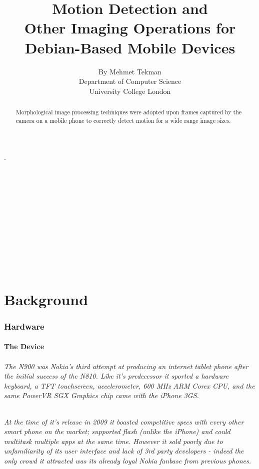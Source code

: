 \documentclass[11pt]{article} %
\title{\Huge Motion Detection and\\Other Imaging Operations for\\Debian-Based Mobile Devices }
\author{\small By Mehmet Tekman\\\small Department of Computer Science\\\small University College London}
\begin{document}
\maketitle 

\part*{}{\tiny .\\\\\\\\\\\\\\\\\\\\\\\\}

\begin{abstract}
 Morphological image processing techniques were adopted upon frames captured by the camera on a mobile phone to correctly detect motion for a wide range image sizes.
\end{abstract}

\pagebreak
\tableofcontents
\pagebreak


\part{Background}
\section{Hardware}

\subsection{The Device}
\paragraph{The N900 was Nokia's third attempt at producing an internet tablet phone after the initial success of the N810. Like it's predecessor it sported a hardware keyboard, a TFT touchscreen, accelerometer, 600 MHz ARM Corex CPU, and the same PowerVR SGX Graphics chip came with the iPhone 3GS.}
\paragraph{At the time of it's release in 2009 it boasted competitive specs with every other smart phone on the market; supported flash (unlike the iPhone) and could multitask multiple apps at the same time. However it sold poorly due to unfamiliarity of its user interface and lack of 3rd party developers - indeed the only crowd it attracted was its already loyal Nokia fanbase from previous phones.}
\end{document}
